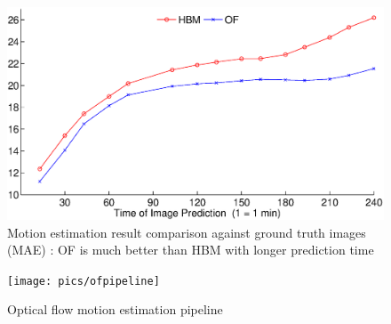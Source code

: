 \documentclass[conference]{IEEEtran}
\begin{document}
\begin{figure}[tb]
\centering
\includegraphics[width=3.2 in]{pics/DFD_all}
\caption{Motion estimation result comparison against ground truth images (MAE) : OF is much better than
HBM with longer prediction time}
\label{fig:dfdall}
\end{figure}




\begin{figure}[tb]
\centering
\texttt{[image: pics/ofpipeline]}
\caption{Optical flow motion estimation pipeline}
\label{fig:OFME}
\end{figure}
\end{document}
